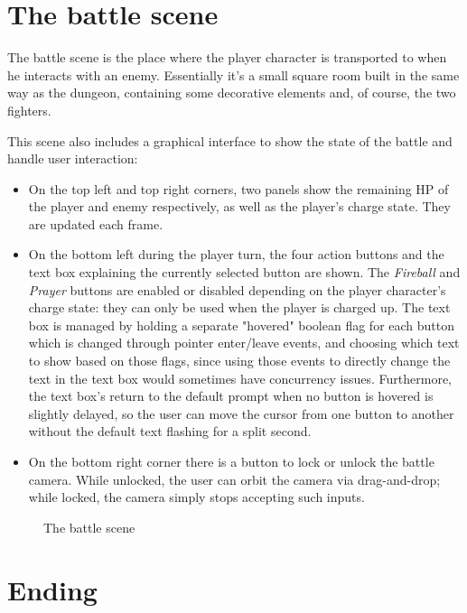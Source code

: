 \section{The battle scene}

The battle scene is the place where the player character is transported to when he interacts with an enemy.
Essentially it's a small square room built in the same way as the dungeon, containing some decorative elements and, of course, the two fighters.

This scene also includes a graphical interface to show the state of the battle and handle user interaction:

\begin{itemize}
    \item On the top left and top right corners, two panels show the remaining HP of the player and enemy respectively, as well as the player's charge state. They are updated each frame.
    \item On the bottom left during the player turn, the four action buttons and the text box explaining the currently selected button are shown. The \textit{Fireball} and \textit{Prayer} buttons are enabled or disabled depending on the player character's charge state: they can only be used when the player is charged up. The text box is managed by holding a separate "hovered" boolean flag for each button which is changed through pointer enter/leave events, and choosing which text to show based on those flags, since using those events to directly change the text in the text box would sometimes have concurrency issues. Furthermore, the text box's return to the default prompt when no button is hovered is slightly delayed, so the user can move the cursor from one button to another without the default text flashing for a split second.
    \item On the bottom right corner there is a button to lock or unlock the battle camera. While unlocked, the user can orbit the camera via drag-and-drop; while locked, the camera simply stops accepting such inputs.
\end{itemize}

\begin{figure}[H]
    \centering
    \caption{The battle scene}
\end{figure}

\section{Ending}

